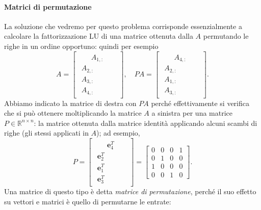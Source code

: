 \documentclass[a4paper]{report}
\theoremstyle{definition}
\theoremstyle{remark}
\begin{document}
\paragraph{Matrici di permutazione}
La soluzione che vedremo per questo problema corrisponde essenzialmente a calcolare la fattorizzazione LU di una matrice ottenuta dalla $A$ permutando le righe in un ordine opportuno: quindi per esempio
\[
A = \begin{bmatrix}
    \begin{array}{c}
    \phantom{AS}A_{1,:}\phantom{AS} \\
    \hline
    A_{2,:} \\
    \hline
    A_{3,:} \\
    \hline
    A_{4,:}    
    \end{array}
\end{bmatrix}, \quad
PA = \begin{bmatrix}
    \begin{array}{c}
    \phantom{AS}A_{4,:}\phantom{AS}\\
    \hline
    A_{2,:}\\
    \hline
    A_{1,:}\\
    \hline
    A_{3,:}
    \end{array}
\end{bmatrix}.
\]
Abbiamo indicato la matrice di destra con $PA$ perché effettivamente si verifica che si può ottenere moltiplicando la matrice $A$ a sinistra per una matrice $P\in\mathbb{R}^{n\times n}$: la matrice ottenuta dalla matrice identità applicando alcuni scambi di righe (gli stessi applicati in $A$); ad esempio,
\[
P = 
\begin{bmatrix}
    \begin{array}{c}
    \phantom{AS}\mathbf{e}_4^T\phantom{AS}\\
    \hline
    \mathbf{e}_2^T\\
    \hline
    \mathbf{e}_1^T\\
    \hline
    \mathbf{e}_3^T        
    \end{array}
\end{bmatrix}
=
\begin{bmatrix}
    0 & 0 & 0 & 1\\
    0 & 1 & 0 & 0\\
    1 & 0 & 0 & 0\\
    0 & 0 & 1 & 0
\end{bmatrix}.
\]
Una matrice di questo tipo è detta \emph{matrice di permutazione}, perché il suo effetto su vettori e matrici è quello di permutarne le entrate:
\end{document}
